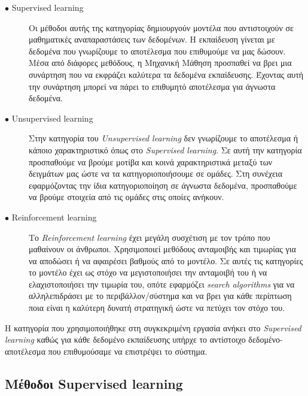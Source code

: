 \begin{description}

\item[$\bullet$ Supervised learning] Οι μέθοδοι αυτής της κατηγορίας δημιουργούν μοντέλα που αντιστοιχούν σε μαθηματικές αναπαραστάσεις των δεδομένων. Η εκπαίδευση γίνεται με δεδομένα που γνωρίζουμε το αποτέλεσμα που επιθυμούμε να μας δώσουν. Μέσα από διάφορες μεθόδους, η Μηχανική Μάθηση προσπαθεί να βρει μια συνάρτηση που να εκφράζει καλύτερα τα δεδομένα εκπαίδευσης. Έχοντας αυτή την συνάρτηση μπορεί να πάρει το επιθυμητό αποτέλεσμα για άγνωστα δεδομένα.

\item[$\bullet$ Unsupervised learning] Στην κατηγορία του \textit{Unsupervised learning} δεν γνωρίζουμε το αποτέλεσμα ή κάποιο χαρακτηριστικό όπως στο \textit{Supervised learning}. Σε αυτή την κατηγορία προσπαθούμε να βρούμε μοτίβα και κοινά χαρακτηριστικά μεταξύ των δειγμάτων μας ώστε να τα κατηγοριοποιήσουμε σε ομάδες. Στη συνέχεια εφαρμόζοντας την ίδια κατηγοριοποίηση σε άγνωστα δεδομένα, προσπαθούμε να βρούμε στοιχεία από τις ομάδες στις οποίες ανήκουν.

\item[$\bullet$ Reinforcement learning] Το \textit{Reinforcement learning} έχει μεγάλη συσχέτιση με τον τρόπο που μαθαίνουν οι άνθρωποι. Χρησιμοποιεί μεθόδους ανταμοιβής και τιμωρίας για να αποδώσει ή να αφαιρέσει βαθμούς από το μοντέλο. Σε αυτές τις κατηγορίες το μοντέλο έχει ως στόχο να μεγιστοποιήσει την ανταμοιβή του ή να ελαχιστοποιήσει την τιμωρία του, οπότε εφαρμόζει \textit{search algorithms} για να αλληλεπιδράσει με το περιβάλλον/σύστημα και να βρει για κάθε περίπτωση ποια είναι η καλύτερη δυνατή στρατηγική ώστε να πετύχει τον στόχο του.

\end{description}

Η κατηγορία που χρησιμοποιήθηκε στη συγκεκριμένη εργασία ανήκει στο \textit{Supervised learning} καθώς για κάθε δεδομένο εκπαίδευσης υπήρχε το αντίστοιχο δεδομένο-αποτέλεσμα που επιθυμούσαμε να επιστρέψει το σύστημα.

\subsection{Μέθοδοι Supervised learning}

